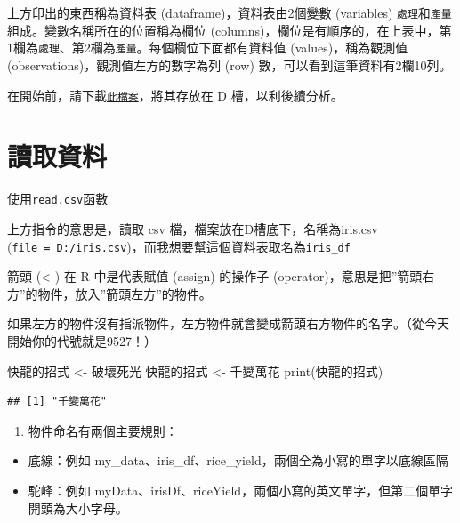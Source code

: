 \documentclass[
]{book}
\newenvironment{Shaded}{\begin{snugshade}}{\end{snugshade}}
\newcommand{\FunctionTok}[1]{\textcolor[rgb]{0.00,0.00,0.00}{#1}}
\newcommand{\NormalTok}[1]{#1}
\newcommand{\OtherTok}[1]{\textcolor[rgb]{0.56,0.35,0.01}{#1}}
\newcommand{\StringTok}[1]{\textcolor[rgb]{0.31,0.60,0.02}{#1}}
\providecommand{\tightlist}{%
  \setlength{\itemsep}{0pt}\setlength{\parskip}{0pt}}
\begin{document}
上方印出的東西稱為資料表 (dataframe)，資料表由2個變數 (variables) \texttt{處理}和\texttt{產量}組成。變數名稱所在的位置稱為欄位 (columns)，欄位是有順序的，在上表中，第1欄為\texttt{處理}、第2欄為\texttt{產量}。每個欄位下面都有資料值 (values)，稱為觀測值 (observations)，觀測值左方的數字為列 (row) 數，可以看到這筆資料有2欄10列。

在開始前，請下載\href{}{\texttt{此檔案}}，將其存放在 D 槽，以利後續分析。

\hypertarget{ux8b80ux53d6ux8cc7ux6599}{%
\section{讀取資料}\label{ux8b80ux53d6ux8cc7ux6599}}

使用\texttt{read.csv}函數

上方指令的意思是，讀取 csv 檔，檔案放在D槽底下，名稱為iris.csv (\texttt{file\ =\ \textquotesingle{}D:/iris.csv\textquotesingle{}})，而我想要幫這個資料表取名為\texttt{iris\_df}

箭頭 (\textless-) 在 R 中是代表賦值 (assign) 的操作子 (operator)，意思是把''箭頭右方''的物件，放入''箭頭左方''的物件。

如果左方的物件沒有指派物件，左方物件就會變成箭頭右方物件的名字。（從今天開始你的代號就是9527！）

\begin{Shaded}
\begin{Highlighting}[]
\NormalTok{快龍的招式 }\OtherTok{\textless{}{-}} \StringTok{\textquotesingle{}破壞死光\textquotesingle{}}
\NormalTok{快龍的招式 }\OtherTok{\textless{}{-}} \StringTok{\textquotesingle{}千變萬花\textquotesingle{}}
\FunctionTok{print}\NormalTok{(快龍的招式)}
\end{Highlighting}
\end{Shaded}

\begin{verbatim}
## [1] "千變萬花"
\end{verbatim}

\begin{enumerate}
\def\labelenumi{\arabic{enumi}.}
\setcounter{enumi}{1}
\tightlist
\item
  物件命名有兩個主要規則：
\end{enumerate}

\begin{itemize}
\tightlist
\item
  底線：例如 my\_data、iris\_df、rice\_yield，兩個全為小寫的單字以底線區隔
\item
  駝峰：例如 myData、irisDf、riceYield，兩個小寫的英文單字，但第二個單字開頭為大小字母。
\end{itemize}
\end{document}

